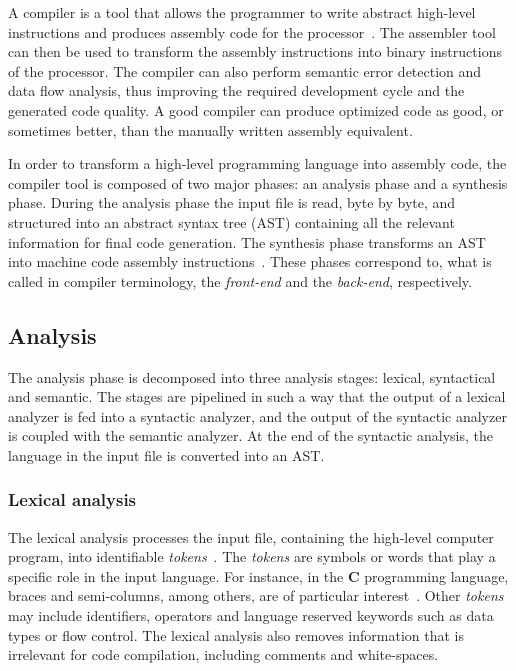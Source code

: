 A compiler is a tool that allows the programmer to write abstract high-level
instructions and produces assembly code for the processor~\cite{aho06,cooper03}.
The assembler tool can then be used to transform the assembly instructions into
binary instructions of the processor.  The compiler can also perform semantic
error detection and data flow analysis, thus improving the required development
cycle and the generated code quality.  A good compiler can produce optimized
code as good, or sometimes better, than the manually written assembly
equivalent.

In order to transform a high-level programming language into assembly code, the
compiler tool is composed of two major phases: an analysis phase and a synthesis
phase.  During the analysis phase the input file is read, byte by byte, and
structured into an abstract syntax tree ({\sc AST}) containing all the relevant
information for final code generation.  The synthesis phase transforms an {\sc
  AST} into machine code assembly instructions~\cite{cooper03,appel08}.  These phases
correspond to, what is called in compiler terminology, the {\it front-end} and the
{\it back-end}, respectively.


\subsection{Analysis}

The analysis phase is decomposed into three analysis stages: lexical,
syntactical and semantic.  The stages are pipelined in such a way that the
output of a lexical analyzer is fed into a syntactic analyzer, and the output of
the syntactic analyzer is coupled with the semantic analyzer.  At the end of the
syntactic analysis, the language in the input file is converted into an {\sc
  AST}.

\subsubsection{Lexical analysis}\label{lex}

The lexical analysis processes the input file, containing the high-level
computer program, into identifiable {\em tokens}~\cite{schreiner85,lexyacc95}.
The {\em tokens} are symbols or words that play a specific role in the input
language.  For instance, in the {\bf C} programming language, braces and
semi-columns, among others, are of particular interest~\cite{cpl}.  Other {\em
  tokens} may include identifiers, operators and language reserved keywords such
as data types or flow control.  The lexical analysis also removes information
that is irrelevant for code compilation, including comments and white-spaces.

